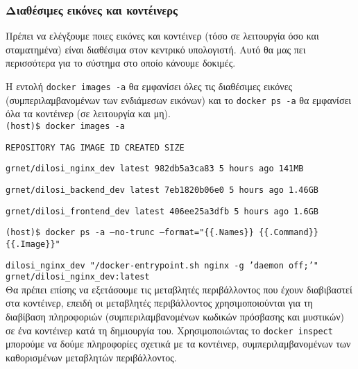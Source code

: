 \subsubsection{Διαθέσιμες εικόνες και κοντέινερς}

Πρέπει να ελέγξουμε ποιες εικόνες και κοντέινερ (τόσο σε λειτουργία όσο και
σταματημένα) είναι διαθέσιμα στον κεντρικό υπολογιστή. Αυτό θα μας πει
περισσότερα για το σύστημα στο οποίο κάνουμε δοκιμές.

Η εντολή \texttt{\textlatin{docker images -a}} θα εμφανίσει όλες τις διαθέσιμες
εικόνες (συμπεριλαμβανομένων των ενδιάμεσων εικόνων) και το
\texttt{\textlatin{docker ps -a}} θα εμφανίσει όλα τα κοντέινερ (σε λειτουργία
και μη). \\

\texttt{\textlatin{(host)\$ docker images -a}}

\texttt{\textlatin{REPOSITORY \hspace{8em} TAG \hspace{1em} IMAGE ID \hspace{1em} CREATED \hspace{1em} SIZE}}

\texttt{\textlatin{grnet/dilosi\_nginx\_dev \hspace{2em} latest 982db5a3ca83 5 hours ago 141MB}}

\texttt{\textlatin{grnet/dilosi\_backend\_dev \hspace{1em} latest 7eb1820b06e0 5 hours ago 1.46GB}}

\texttt{\textlatin{grnet/dilosi\_frontend\_dev \hspace{0.5em} latest 406ee25a3dfb 5 hours ago 1.6GB}} 

\texttt{\textlatin{(host)\$ docker ps -a --no-trunc --format="\{\{.Names\}\} \{\{.Command\}\} \{\{.Image\}\}"}} 

\texttt{\textlatin{dilosi\_nginx\_dev "/docker-entrypoint.sh nginx -g 'daemon off;'" grnet/dilosi\_nginx\_dev:latest}} \\ 


Θα πρέπει επίσης να εξετάσουμε τις μεταβλητές περιβάλλοντος που έχουν
διαβιβαστεί στα κοντέινερ, επειδή οι μεταβλητές περιβάλλοντος χρησιμοποιούνται
για τη διαβίβαση πληροφοριών (συμπεριλαμβανομένων κωδικών πρόσβασης και
μυστικών) σε ένα κοντέινερ κατά τη δημιουργία του. Χρησιμοποιώντας το
\texttt{\textlatin{docker inspect}} μπορούμε να δούμε πληροφορίες σχετικά με τα
κοντέινερ, συμπεριλαμβανομένων των καθορισμένων μεταβλητών περιβάλλοντος. \\


